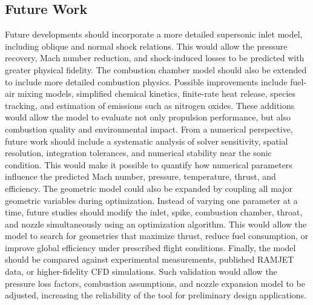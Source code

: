 \documentclass[preprint,12pt]{elsarticle}
\begin{document}
\subsection{Future Work}
Future developments should incorporate a more detailed supersonic inlet model, including oblique and normal shock relations. This would allow the pressure recovery, Mach number reduction, and shock-induced losses to be predicted with greater physical fidelity.
The combustion chamber model should also be extended to include more detailed combustion physics. Possible improvements include fuel-air mixing models, simplified chemical kinetics, finite-rate heat release, species tracking, and estimation of emissions such as nitrogen oxides. These additions would allow the model to evaluate not only propulsion performance, but also combustion quality and environmental impact.
From a numerical perspective, future work should include a systematic analysis of solver sensitivity, spatial resolution, integration tolerances, and numerical stability near the sonic condition. This would make it possible to quantify how numerical parameters influence the predicted Mach number, pressure, temperature, thrust, and efficiency.
The geometric model could also be expanded by coupling all major geometric variables during optimization. Instead of varying one parameter at a time, future studies should modify the inlet, spike, combustion chamber, throat, and nozzle simultaneously using an optimization algorithm. This would allow the model to search for geometries that maximize thrust, reduce fuel consumption, or improve global efficiency under prescribed flight conditions.
Finally, the model should be compared against experimental measurements, published RAMJET data, or higher-fidelity CFD simulations. Such validation would allow the pressure loss factors, combustion assumptions, and nozzle expansion model to be adjusted, increasing the reliability of the tool for preliminary design applications.
\end{document}
